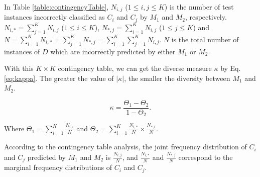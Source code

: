 \documentclass[prodmode,acmtkdd]{acmsmall}
\begin{document}
\begin{table}[!h]
    \caption{The $K\times K$ Contingency Table of Two Learning Models}\label{table:contingencyTable}
    \centering
\end{table}

In Table \ref{table:contingencyTable}, $N_{i,j}$ ($1\leq i, j\leq
K$) is the number of test instances incorrectly classified as $C_i$
and $C_j$ by $M_1$ and $M_2$, respectively. $N_{i,*} =
\sum_{j = 1}^{K}N_{i,j}$ ($1\leq i\leq K$), $N_{*,j} =
\sum_{i = 1}^{K}N_{i,j}$ ($1\leq j\leq K$) and $N =
\sum_{i=1}^{K}N_{i,*} = \sum_{j=1}^{K}N_{*,j} =
\sum_{i=1}^{K}\sum_{j=1}^{K}N_{i,j}$. $N$ is the total
number of instances of $D$ which are incorrectly predicted by either
$M_1$ or $M_2$.

With this $K\times K$ contingency table, we can get the diverse
measure $\kappa$ by Eq. \ref{eq:kappa}. The greater the value of
$|\kappa|$, the smaller the diversity between $M_1$ and $M_2$.

\begin{equation}\label{eq:kappa}
    \kappa = \frac{\Theta_1 - \Theta_2}{1 - \Theta_{2}}.
\end{equation}

Where $\Theta_1 = \sum\limits_{i=1}^{K}\frac{N_{i,i}}{N}$ and
$\Theta_2 =
\sum\limits_{i=1}^{K}\frac{N_{i,*}}{N}\times\frac{N_{*,i}}{N}$.

According to the contingency table analysis, the joint frequency
distribution of $C_i$ and $C_j$ predicted by $M_1$ and $M_2$ is
$\frac{N_{i,j}}{N}$, and $\frac{N_{i,*}}{N}$ and $\frac{N_{*,j}}{N}$
correspond to the marginal frequency distributions of $C_i$ and
$C_j$.
\end{document}
